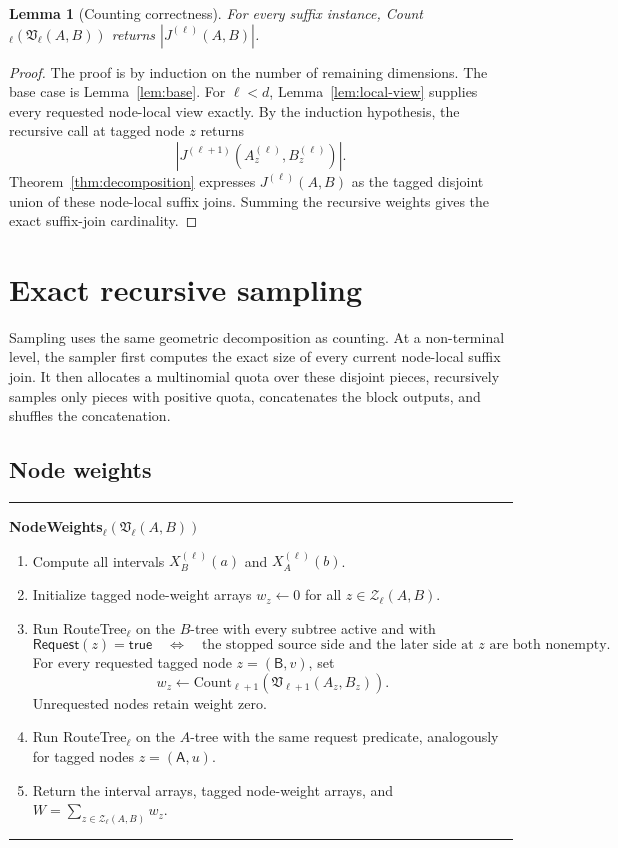 \documentclass[11pt]{article}
\newcommand{\Znodes}{\mathcal Z}
\newcommand{\Request}{\ensuremath{\mathsf{Request}}}
\newcommand{\true}{\ensuremath{\mathsf{true}}}
\newcommand{\sideA}{\ensuremath{\mathsf A}}
\newcommand{\sideB}{\ensuremath{\mathsf B}}
\newtheorem{lemma}[theorem]{Lemma}
\theoremstyle{definition}
\newenvironment{algorithmbox}[1]{%
  \par\medskip\noindent\hrule\smallskip
  \noindent\textbf{#1}\par\smallskip
  \begin{enumerate}[leftmargin=1.7em,itemsep=2pt,topsep=2pt]
}{%
  \end{enumerate}
  \smallskip\hrule\medskip
}
\begin{document}
\begin{lemma}[Counting correctness]
\label{lem:counting}
For every suffix instance, Count$_\ell(\mathfrak V_\ell(A,B))$ returns $|J^{(\ell)}(A,B)|$.
\end{lemma}

\begin{proof}
The proof is by induction on the number of remaining dimensions.  The base case is Lemma~\ref{lem:base}.  For $\ell<d$, Lemma~\ref{lem:local-view} supplies every requested node-local view exactly.  By the induction hypothesis, the recursive call at tagged node $z$ returns
\[
  |J^{(\ell+1)}(A_z^{(\ell)},B_z^{(\ell)})|.
\]
Theorem~\ref{thm:decomposition} expresses $J^{(\ell)}(A,B)$ as the tagged disjoint union of these node-local suffix joins.  Summing the recursive weights gives the exact suffix-join cardinality.
\end{proof}

\section{Exact recursive sampling}
\label{sec:sampling}

Sampling uses the same geometric decomposition as counting.  At a non-terminal level, the sampler first computes the exact size of every current node-local suffix join.  It then allocates a multinomial quota over these disjoint pieces, recursively samples only pieces with positive quota, concatenates the block outputs, and shuffles the concatenation.

\subsection{Node weights}

\begin{algorithmbox}{NodeWeights$_\ell(\mathfrak V_\ell(A,B))$}
\item Compute all intervals $X_B^{(\ell)}(a)$ and $X_A^{(\ell)}(b)$.
\item Initialize tagged node-weight arrays $w_z\leftarrow0$ for all $z\in\Znodes_\ell(A,B)$.
\item Run RouteTree$_\ell$ on the $B$-tree with every subtree active and with
\[
  \Request(z)=\true
  \quad\Longleftrightarrow\quad
  \text{the stopped source side and the later side at }z\text{ are both nonempty}.
\]
For every requested tagged node $z=(\sideB,v)$, set
\[
  w_z\leftarrow \mathrm{Count}_{\ell+1}(\mathfrak V_{\ell+1}(A_z,B_z)).
\]
Unrequested nodes retain weight zero.
\item Run RouteTree$_\ell$ on the $A$-tree with the same request predicate, analogously for tagged nodes $z=(\sideA,u)$.
\item Return the interval arrays, tagged node-weight arrays, and $W=\sum_{z\in\Znodes_\ell(A,B)}w_z$.
\end{algorithmbox}
\end{document}
